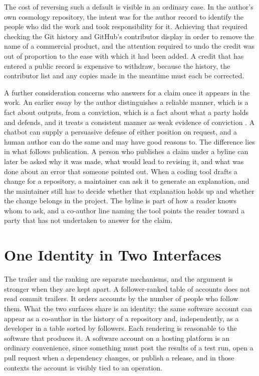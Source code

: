 \documentclass[11pt]{article}
\begin{document}
The cost of reversing such a default is visible in an ordinary case. In the author's own cosmology repository, the intent was for the author record to identify the people who did the work and took responsibility for it. Achieving that required checking the Git history and GitHub's contributor display in order to remove the name of a commercial product, and the attention required to undo the credit was out of proportion to the ease with which it had been added. A credit that has entered a public record is expensive to withdraw, because the history, the contributor list and any copies made in the meantime must each be corrected.

A further consideration concerns who answers for a claim once it appears in the work. An earlier essay by the author distinguishes a reliable manner, which is a fact about outputs, from a conviction, which is a fact about what a party holds and defends, and it treats a consistent manner as weak evidence of conviction \cite{personbehind}. A chatbot can supply a persuasive defense of either position on request, and a human author can do the same and may have good reasons to. The difference lies in what follows publication. A person who publishes a claim under a byline can later be asked why it was made, what would lead to revising it, and what was done about an error that someone pointed out. When a coding tool drafts a change for a repository, a maintainer can ask it to generate an explanation, and the maintainer still has to decide whether that explanation holds up and whether the change belongs in the project. The byline is part of how a reader knows whom to ask, and a co-author line naming the tool points the reader toward a party that has not undertaken to answer for the claim.

\section{One Identity in Two Interfaces}

The trailer and the ranking are separate mechanisms, and the argument is stronger when they are kept apart. A follower-ranked table of accounts does not read commit trailers. It orders accounts by the number of people who follow them. What the two surfaces share is an identity: the same software account can appear as a co-author in the history of a repository and, independently, as a developer in a table sorted by followers. Each rendering is reasonable to the software that produces it. A software account on a hosting platform is an ordinary convenience, since something must post the results of a test run, open a pull request when a dependency changes, or publish a release, and in those contexts the account is visibly tied to an operation.
\end{document}
